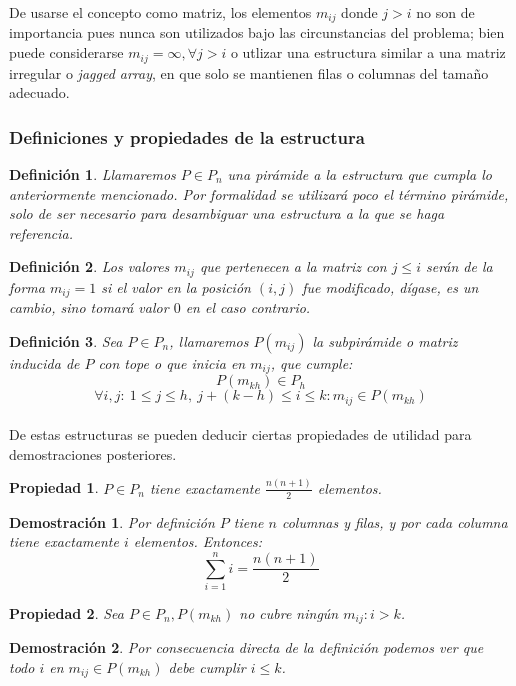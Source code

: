 \documentclass{article}
\theoremstyle{default}
\newtheorem*{demonstration}{Demostración}
\newtheorem*{definition}{Definición}
\newtheorem{property}{Propiedad}
\begin{document}
			De usarse el concepto como matriz, los elementos $m_{ij}$ donde $j > i$ no son de importancia pues nunca son utilizados bajo las circunstancias del problema; bien puede considerarse $m_{ij} = \infty, \forall j > i$ o utlizar una estructura similar a una matriz irregular o \textit{jagged array}, en que solo se mantienen filas o columnas del tamaño adecuado.
		\subsubsection{Definiciones y propiedades de la estructura}
			\begin{definition}
				Llamaremos $P \in P_n$ una pirámide a la estructura que cumpla lo anteriormente mencionado. Por formalidad se utilizará poco el término pirámide, solo de ser necesario para desambiguar una estructura a la que se haga referencia.
			\end{definition}
			\begin{definition}
				Los valores $m_{ij}$ que pertenecen a la matriz con $j \leq i$ serán de la forma $m_{ij} = 1$ si el valor en la posición $(i,j)$ fue modificado, dígase, es un cambio, sino tomará valor $0$ en el caso contrario.
			\end{definition}
			\begin{definition}
				Sea $P \in P_n$, llamaremos $P(m_{ij})$ la subpirámide o matriz inducida de $P$ con tope o que inicia en $m_{ij}$, que cumple:
				\begin{equation*}
					P(m_{kh}) \in P_{h}
				\end{equation*}
				\begin{equation*}
					\forall i,j:\ 1 \leq j \leq h,\ j+(k-h) \leq i \leq k: m_{ij} \in P(m_{kh})
				\end{equation*} 

			\end{definition}
			\paragraph{}De estas estructuras se pueden deducir ciertas propiedades de utilidad para demostraciones posteriores.
			\begin{property}
				$P \in P_n$ tiene exactamente $\frac{n(n+1)}{2}$ elementos.
			\end{property}
			\begin{demonstration}
				Por definición $P$ tiene $n$ columnas y filas, y por cada columna tiene exactamente $i$ elementos. Entonces:
				\begin{equation*}
					\sum\limits_{i=1}^{n}{i} = \frac{n(n+1)}{2}
				\end{equation*}
			\end{demonstration}
			\begin{property}\label{no-left-column-property}
				Sea $P \in P_n, P(m_{kh})$ no cubre ningún $m_{ij}: i > k$.
			\end{property}
			\begin{demonstration}
				Por consecuencia directa de la definición podemos ver que todo $i$ en $m_{ij} \in P(m_{kh})$ debe cumplir $i \leq k$.
			\end{demonstration}
\end{document}
